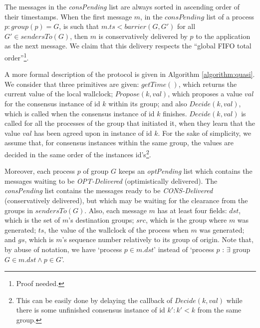 \documentclass[times, 10pt]{article}
\begin{document}
The messages in the \textit{consPending} list are always sorted in ascending order of their timestamps. When the first message $m$, in the $consPending$ list of a process $p : group(p) = G$, is such that $m.ts < barrier(G, G')$ for all $G' \in sendersTo(G)$, then $m$ is conservatively delivered by $p$ to the application as the next message. We claim that this delivery respects the ``global FIFO total order''\footnote{Proof needed.}.


A more formal description of the protocol is given in Algorithm \ref{algorithm:quasi}. We consider that three primitives are given: $getTime()$, which returns the current value of the local wallclock; $Propose(k, val)$, which proposes a value $val$ for the consensus instance of id $k$ within its group; and also $Decide(k, val)$, which is called when the consensus instance of id $k$ finishes. $Decide(k, val)$ is called for all the processes of the group that initiated it, when they learn that the value $val$ has been agreed upon in instance of id $k$. For the sake of simplicity, we assume that, for consensus instances within the same group, the values are decided in the same order of the instances id's\footnote{This can be easily done by delaying the callback of $Decide(k, val)$ while there is some unfinished consensus instance of id $k': k' < k$ from the same group.}.

Moreover, each process $p$ of group $G$ keeps an \textit{optPending} list which contains the messages waiting to be \textit{OPT-Delivered} (optimistically delivered). The \mbox{\textit{consPending}} list contains the messages ready to be \textit{CONS-Delivered} (conservatively delivered), but which may be waiting for the clearance from the groups in $sendersTo(G)$. Also, each message $m$ has at least four fields: $dst$, which is the set of $m$'s destination groups; $src$, which is the group where $m$ was generated; $ts$, the value of the wallclock of the process when $m$ was generated; and $gs$, which is $m$'s sequence number relatively to its group of origin. Note that, by abuse of notation, we have `process $p \in m.dst$' instead of `process $p$ : $\exists$ group $G \in m.dst \wedge p \in G$'.
\end{document}
